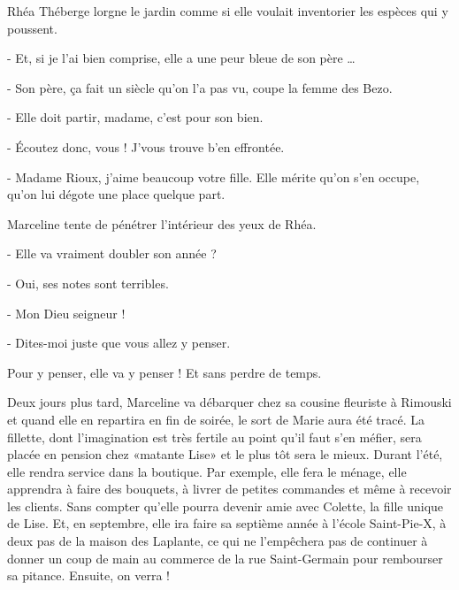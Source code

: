 Rhéa Théberge lorgne le jardin comme si elle voulait inventorier les espèces qui y poussent.

- Et, si je l’ai bien comprise, elle a une peur bleue de son père …

- Son père, ça fait un siècle qu’on l’a pas vu, coupe la femme des Bezo.

- Elle doit partir, madame, c’est pour son bien.

- Écoutez donc, vous ! J’vous trouve b’en effrontée.

- Madame Rioux, j’aime beaucoup votre fille. Elle mérite qu’on s’en occupe, qu’on lui dégote une place quelque part.

Marceline tente de pénétrer l’intérieur des yeux de Rhéa.

- Elle va vraiment doubler son année ?

- Oui, ses notes sont terribles.

- Mon Dieu seigneur !

- Dites-moi juste que vous allez y penser.

Pour y penser, elle va y penser ! Et sans perdre de temps.

Deux jours plus tard, Marceline va débarquer chez sa cousine fleuriste à Rimouski et quand elle en repartira en fin de soirée, le sort de Marie aura été tracé. La fillette, dont l’imagination est très fertile au point qu’il faut s’en méfier, sera placée en pension chez «matante Lise» et le plus tôt sera le mieux. Durant l’été, elle rendra service dans la boutique. Par exemple, elle fera le ménage, elle apprendra à faire des bouquets, à livrer de petites commandes et même à recevoir les clients. Sans compter qu’elle pourra devenir amie avec Colette, la fille unique de Lise. Et, en septembre, elle ira faire sa septième année à l’école Saint-Pie-X, à deux pas de la maison des Laplante, ce qui ne l’empêchera pas de continuer à donner un coup de main au commerce de la rue Saint-Germain pour rembourser sa pitance. Ensuite, on verra !

